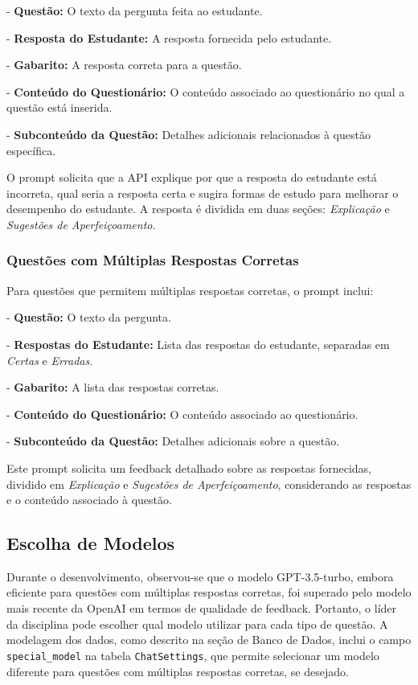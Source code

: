 - \textbf{Questão:} O texto da pergunta feita ao estudante.

- \textbf{Resposta do Estudante:} A resposta fornecida pelo estudante.

- \textbf{Gabarito:} A resposta correta para a questão.

- \textbf{Conteúdo do Questionário:} O conteúdo associado ao questionário no qual a questão está inserida.

- \textbf{Subconteúdo da Questão:} Detalhes adicionais relacionados à questão específica.

O prompt solicita que a API explique por que a resposta do estudante está incorreta, qual seria a resposta certa e sugira formas de estudo para melhorar o desempenho do estudante. A resposta é dividida em duas seções: \textit{Explicação} e \textit{Sugestões de Aperfeiçoamento}.

\subsubsection{Questões com Múltiplas Respostas Corretas}

Para questões que permitem múltiplas respostas corretas, o prompt inclui:

- \textbf{Questão:} O texto da pergunta.

- \textbf{Respostas do Estudante:} Lista das respostas do estudante, separadas em \textit{Certas} e \textit{Erradas}.

- \textbf{Gabarito:} A lista das respostas corretas.

- \textbf{Conteúdo do Questionário:} O conteúdo associado ao questionário.

- \textbf{Subconteúdo da Questão:} Detalhes adicionais sobre a questão.

Este prompt solicita um feedback detalhado sobre as respostas fornecidas, dividido em \textit{Explicação} e \textit{Sugestões de Aperfeiçoamento}, considerando as respostas e o conteúdo associado à questão.

\subsection{Escolha de Modelos}

Durante o desenvolvimento, observou-se que o modelo GPT-3.5-turbo, embora eficiente para questões com múltiplas respostas corretas, foi superado pelo modelo mais recente da OpenAI em termos de qualidade de feedback. Portanto, o líder da disciplina pode escolher qual modelo utilizar para cada tipo de questão. A modelagem dos dados, como descrito na seção de Banco de Dados, inclui o campo \texttt{special\_model} na tabela \texttt{ChatSettings}, que permite selecionar um modelo diferente para questões com múltiplas respostas corretas, se desejado.

